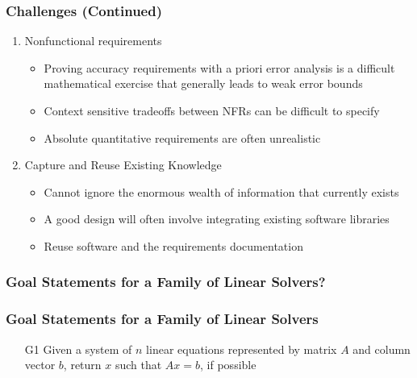 \documentclass[t,12pt,numbers,fleqn]{beamer}
\newcounter{temp}
\begin{document}

\begin{frame}

\frametitle{Challenges (Continued)}

\begin{enumerate}
\setcounter{enumi}{\value{temp}}
\item Nonfunctional requirements
\begin{itemize}
\item Proving accuracy requirements with a priori error analysis is a difficult mathematical exercise that generally
leads to weak error bounds
\item Context sensitive tradeoffs between NFRs can be difficult to specify
\item Absolute quantitative requirements are often unrealistic
\end{itemize}
\item Capture and Reuse Existing Knowledge
\begin{itemize}
\item Cannot ignore the enormous wealth of information that currently exists %
\item A good design will often involve integrating existing software libraries
\item Reuse software and the requirements documentation
\end{itemize}

\setcounter{temp}{\value{enumi}}
\end{enumerate}

\end{frame}


\begin{frame}
\frametitle{Goal Statements for a Family of Linear Solvers?}


\end{frame}


\begin{frame}
\frametitle{Goal Statements for a Family of Linear Solvers}

\begin{itemize}
	
\item[G1] Given a system of $n$ linear equations represented by matrix $A$ and
  column vector $b$, return $x$ such that $Ax = b$, if possible

\end{itemize}

\end{frame}
\end{document}
